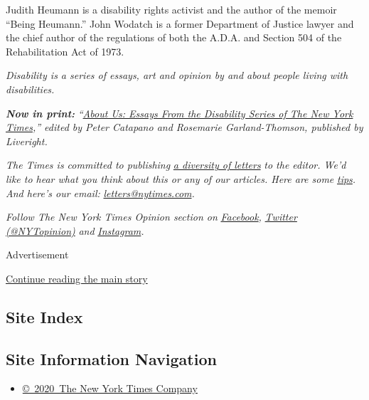 Judith Heumann is a disability rights activist and the author of the
memoir ``Being Heumann.'' John Wodatch is a former Department of Justice
lawyer and the chief author of the regulations of both the A.D.A. and
Section 504 of the Rehabilitation Act of 1973.

\emph{Disability is a series of essays, art and opinion by and about
people living with disabilities.}

\emph{\textbf{Now in print:}}
\emph{``}\href{https://www.aboutusbook.com/}{\emph{About Us: Essays From
the Disability Series of The New York Times}}\emph{,'' edited by Peter
Catapano and Rosemarie Garland-Thomson, published by Liveright.}

\emph{The Times is committed to publishing}
\href{https://www.nytimes.com/2019/01/31/opinion/letters/letters-to-editor-new-york-times-women.html}{\emph{a
diversity of letters}} \emph{to the editor. We'd like to hear what you
think about this or any of our articles. Here are some}
\href{https://help.nytimes.com/hc/en-us/articles/115014925288-How-to-submit-a-letter-to-the-editor}{\emph{tips}}\emph{.
And here's our email:}
\href{mailto:letters@nytimes.com}{\emph{letters@nytimes.com}}\emph{.}

\emph{Follow The New York Times Opinion section on}
\href{https://www.facebook.com/nytopinion}{\emph{Facebook}}\emph{,}
\href{http://twitter.com/NYTOpinion}{\emph{Twitter (@NYTopinion)}}
\emph{and}
\href{https://www.instagram.com/nytopinion/}{\emph{Instagram}}\emph{.}

Advertisement

\protect\hyperlink{after-bottom}{Continue reading the main story}

\hypertarget{site-index}{%
\subsection{Site Index}\label{site-index}}

\hypertarget{site-information-navigation}{%
\subsection{Site Information
Navigation}\label{site-information-navigation}}

\begin{itemize}
\tightlist
\item
  \href{https://help.nytimes.com/hc/en-us/articles/115014792127-Copyright-notice}{©~2020~The
  New York Times Company}
\end{itemize}

